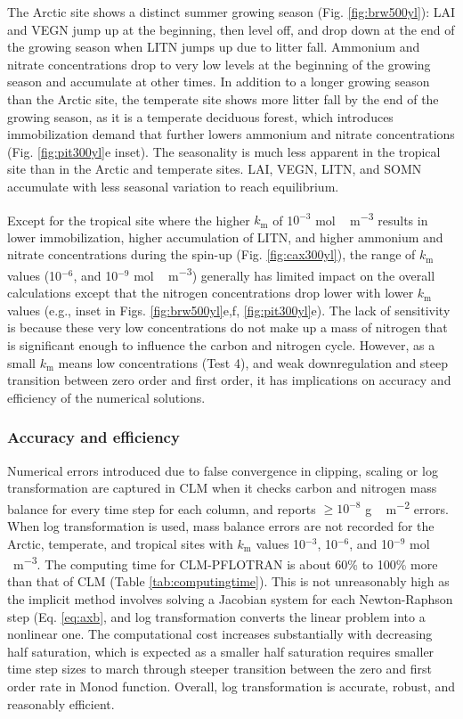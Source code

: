 \documentclass[gmd, manuscript]{copernicus}
\begin{document}
The Arctic site shows a distinct summer growing season (Fig.
\ref{fig:brw500yl}): LAI and VEGN jump up at the beginning, then level off, and
drop down at the end of the growing season when LITN jumps up due to litter fall.
Ammonium and nitrate concentrations drop to very low levels at the beginning of
the growing season and accumulate at other times. In addition to a longer growing
season than the Arctic site, the temperate site shows more litter fall by the
end of the growing season, as it is a temperate deciduous forest, which introduces
immobilization demand that further lowers ammonium and nitrate
concentrations (Fig. \ref{fig:pit300yl}e inset). The seasonality is much less
apparent in the tropical site than in the Arctic and temperate sites. LAI,
VEGN, LITN, and SOMN accumulate with less seasonal variation to reach 
equilibrium. 

Except for the tropical site where the higher $k_\text{m}$ of 1$0^{-3}$
\unit{mol\,m^{-3}} results in lower immobilization, higher accumulation of
LITN, and higher ammonium and nitrate concentrations during the spin-up (Fig.
\ref{fig:cax300yl}), the range of $k_\text{m}$ values (10$^{-6}$,
and 10$^{-9}$ \unit{mol\,m^{-3}}) generally has limited impact on the overall
calculations except that the nitrogen concentrations drop lower with lower
$k_\text{m}$ values (e.g., inset in Figs. \ref{fig:brw500yl}e,f,
\ref{fig:pit300yl}e). The lack of
sensitivity is because these very low concentrations do not make up a mass of
nitrogen that is significant enough to influence the carbon and nitrogen cycle.
However, as a small $k_\text{m}$ means low concentrations (Test 4), and weak downregulation and steep transition
between zero order and first order, it has implications on accuracy
and efficiency of the numerical solutions.

\subsubsection{Accuracy and efficiency}
Numerical errors introduced due to false convergence in clipping, scaling or
log transformation are captured in CLM when it checks carbon and nitrogen mass
balance for every time step for each column, and reports  $\geq 10^{-8}$
\unit{g\,m^{-2}} errors.  
When log transformation is used, 
mass balance errors are not recorded for the Arctic, temperate, and tropical
sites with $k_\text{m}$ values 
10$^{-3}$, 10$^{-6}$, and 10$^{-9}$ \unit{mol\,m^{-3}}. The computing time for
CLM-PFLOTRAN is about 60\% to 100\% more than that of CLM (Table
\ref{tab:computingtime}). This is not unreasonably high as the implicit
method involves solving a Jacobian system for each Newton-Raphson step (Eq. \ref{eq:axb}, and log transformation converts
the linear
problem into a nonlinear one. 
The computational cost increases substantially with
decreasing half saturation, which is expected as a smaller half saturation
requires smaller time step sizes to march through steeper transition between
the zero and first order rate in Monod function. Overall, log transformation is
accurate, robust, and reasonably efficient.  
\end{document}
